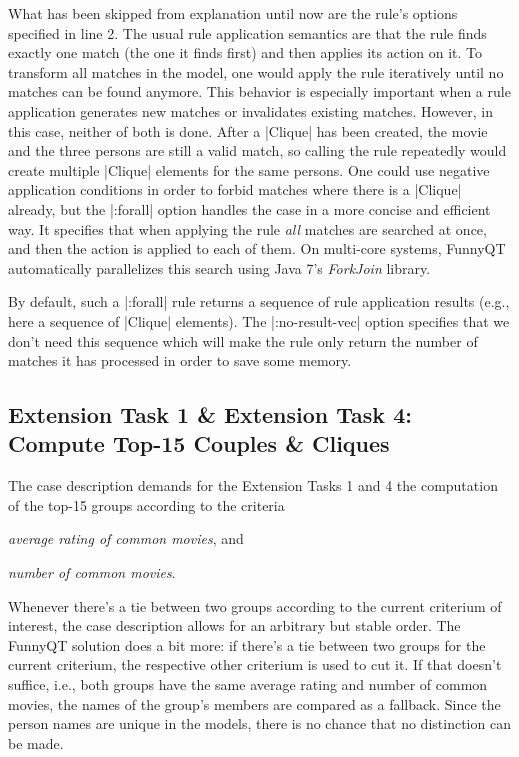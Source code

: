 \documentclass[submission]{eptcs}
\newcommand{\code}{\clojureinline}
\begin{document}
What has been skipped from explanation until now are the rule's options
specified in line 2.  The usual rule application semantics are that the rule
finds exactly one match (the one it finds first) and then applies its action on
it.  To transform all matches in the model, one would apply the rule
iteratively until no matches can be found anymore.  This behavior is especially
important when a rule application generates new matches or invalidates existing
matches.  However, in this case, neither of both is done.  After a
\code|Clique| has been created, the movie and the three persons are still a
valid match, so calling the rule repeatedly would create multiple \code|Clique|
elements for the same persons.  One could use negative application conditions
in order to forbid matches where there is a \code|Clique| already, but the
\code|:forall| option handles the case in a more concise and efficient way.  It
specifies that when applying the rule \emph{all} matches are searched at once,
and then the action is applied to each of them.  On multi-core systems, FunnyQT
automatically parallelizes this search using Java 7's \emph{ForkJoin} library.

By default, such a \code|:forall| rule returns a sequence of rule application
results (e.g., here a sequence of \code|Clique| elements).  The
\code|:no-result-vec| option specifies that we don't need this sequence which
will make the rule only return the number of matches it has processed in order
to save some memory.


\subsection{Extension Task 1 \& Extension Task 4: Compute Top-15 Couples \&
  Cliques}
\label{sec:ext-task-1:top-15}

The case description demands for the Extension Tasks 1 and 4 the computation of
the top-15 groups according to the criteria
\begin{inparaenum}[(a)]
\item \emph{average rating of common movies}, and
\item \emph{number of common movies}.
\end{inparaenum}

Whenever there's a tie between two groups according to the current criterium of
interest, the case description allows for an arbitrary but stable order.  The
FunnyQT solution does a bit more: if there's a tie between two groups for the
current criterium, the respective other criterium is used to cut it.  If that
doesn't suffice, i.e., both groups have the same average rating and number of
common movies, the names of the group's members are compared as a fallback.
Since the person names are unique in the models, there is no chance that no
distinction can be made.
\end{document}
